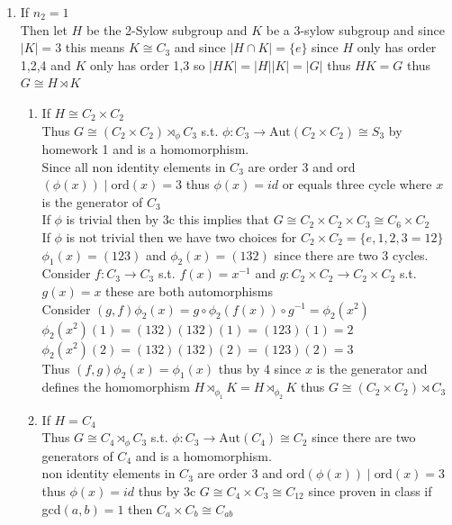 \documentclass[12pt, letterpaper]{article}
\theoremstyle{definition}
\renewcommand{\t}[1]{\text{#1}}
\begin{document}
\begin{enumerate}
    \item If $n_2=1$\\
    Then let $H$ be the 2-Sylow subgroup and $K$ be a 3-sylow subgroup and since $|K|=3$ this means $K\cong C_3$ and since $|H \cap K|=\{e\}$ since $H$ only has order 1,2,4 and $K$ only has order 1,3 so $|HK|=|H||K|=|G|$ thus $HK=G$ thus $G \cong H \rtimes K$
    \begin{enumerate}
        \item If $H \cong C_2 \times C_2$\\
        Thus $G \cong (C_2 \times C_2) \rtimes_\phi C_3$ s.t. $\phi : C_3 \rightarrow \t{Aut}(C_2 \times C_2) \cong S_3$ by homework 1 and is a homomorphism.\\
        Since all non identity elements in $C_3$ are order 3 and ord$(\phi(x)) \mid \t{ord}(x)=3$ thus $\phi(x)=id$ or equals three cycle where $x$ is the generator of $C_3$\\
        If $\phi$ is trivial then by 3c this implies that $G \cong C_2 \times C_2 \times C_3 \cong C_6 \times C_2$\\
        If $\phi$ is not trivial then we have two choices for $C_2 \times C_2 = \{e,1,2,3=12\}$ $\phi_1(x)=(123)$ and $\phi_2(x)=(132)$ since there are two 3 cycles. Consider $f : C_3 \rightarrow C_3$ s.t. $f(x)=x^{-1}$
        and $g : C_2\times C_2 \rightarrow C_2 \times C_2$ s.t. $g(x)=x$ these are both automorphisms\\
        Consider $(g,f)\phi_2(x)= g \circ \phi_2(f(x)) \circ g^{-1}=\phi_2(x^2)$\\
        $\phi_2(x^2)(1)=(132)(132)(1)=(123)(1)=2$\\
        $\phi_2(x^2)(2)=(132)(132)(2)=(123)(2)=3$\\
        Thus $(f,g)\phi_{2}(x)=\phi_1(x)$ thus by 4 since $x$ is the generator and defines the homomorphism $H \rtimes_{\phi_1} K = H \rtimes_{\phi_{2}} K$ thus $G \cong (C_2 \times C_2) \rtimes C_3$
        \item If $H=C_4$\\
        Thus $G \cong C_4 \rtimes_\phi C_3$ s.t. $\phi : C_3 \rightarrow \t{Aut}(C_4) \cong C_2$ since there are two generators of $C_4$ and is a homomorphism.\\
        non identity elements in $C_3$ are order 3 and ord$(\phi(x)) \mid \t{ord}(x)=3$ thus $\phi(x)=id$ thus by 3c $G \cong C_4 \times C_3 \cong C_{12}$ since proven in class if gcd$(a,b)=1$ then $C_a \times C_b \cong C_{ab}$
    \end{enumerate}

\end{enumerate}
\end{document}
